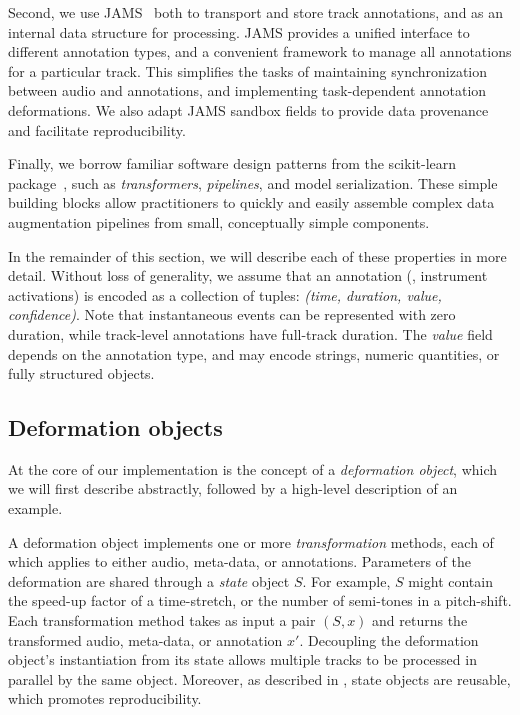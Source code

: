 \documentclass{article}
\begin{document}
Second, we use JAMS~\cite{humphreyjams} both to transport and store track annotations, 
and as an internal data structure for processing.
JAMS provides a unified interface to different annotation types, and a convenient framework to 
manage all annotations for a particular track.
This simplifies the tasks of maintaining synchronization between audio and annotations,
and implementing task-dependent annotation deformations.  
We also adapt JAMS sandbox fields to provide data provenance and facilitate reproducibility.

%
Finally, we borrow familiar software design patterns from the scikit-learn
package~\cite{buitinck2013api}, such as \emph{transformers}, \emph{pipelines}, 
and model serialization.  These simple building blocks allow
practitioners to quickly and easily assemble complex data augmentation pipelines 
from small, conceptually simple components.


In the remainder of this section, we will describe each of these
properties in more detail.  Without loss of generality, we assume that an
annotation (\eg, instrument activations) is encoded as a collection of
tuples: \emph{(time, duration, value, confidence)}.
Note that instantaneous events can be represented with zero duration, while
track-level annotations have full-track duration.  The \emph{value} field depends on
the annotation type, and may encode strings, numeric quantities, or fully structured
objects.

\subsection{Deformation objects}

At the core of our implementation is the concept of a \emph{deformation object}, which we will 
first describe abstractly, followed by a high-level description of an example.

A deformation object implements one or more \emph{transformation} methods, each of which
applies to either audio, meta-data, or annotations.
Parameters of the deformation are shared through a \emph{state} object $S$.
For example, $S$ might contain the speed-up factor of a
time-stretch, or the number of semi-tones in a pitch-shift.  
Each transformation method takes as input a pair $(S, x)$ and
returns the transformed audio, meta-data, or annotation $x'$.
Decoupling the deformation object's instantiation from
its state allows multiple tracks to be processed in parallel by the same object.
Moreover, as described in , 
state objects are reusable, which promotes reproducibility.
\end{document}
